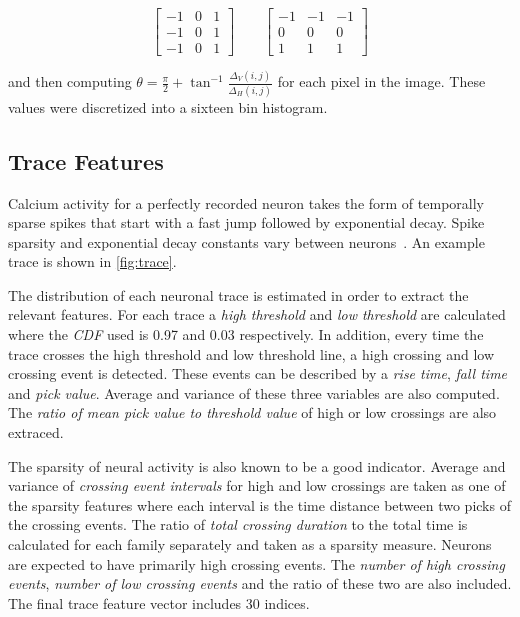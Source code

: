 \documentclass[10pt]{article}
\begin{document}
$$
\begin{bmatrix}
-1 & 0 & 1 \\ -1 & 0 & 1 \\ -1 & 0 & 1
\end{bmatrix} \qquad
\begin{bmatrix}
-1 & -1 & -1 \\
0 & 0 & 0 \\
1 & 1 & 1
\end{bmatrix}
$$

\noindent
and then computing $\theta = \frac{\pi}{2} + \tan^{-1}\frac{\Delta_V(i,j)}{\Delta_H(i,j)}$ for each pixel in the image.
These values were discretized into a sixteen bin histogram.

\subsection{Trace Features}

Calcium activity for a perfectly recorded neuron takes the form of temporally sparse spikes that start with a fast jump followed by exponential decay. Spike sparsity and exponential decay constants vary between neurons~\cite{Mukamel2009}. 
An example trace is shown in \cref{fig:trace}.

The distribution of each neuronal trace is estimated in order to extract the relevant features. For each trace a \emph{high threshold} and \emph{low threshold} are calculated where the \emph{CDF} used is \num{0.97} and \num{0.03} respectively. In addition, every time the trace crosses the high threshold and low threshold line, a high crossing and low crossing event is detected. These events can be described by a \emph{rise time}, \emph{fall time} and \emph{pick value}. Average and variance of these three variables are also computed. The \emph{ratio of mean pick value to threshold value} of high or low crossings are also extraced.

The sparsity of neural activity is also known to be a good indicator. Average and variance of \emph{crossing event intervals} for high and low crossings are taken as one of the sparsity features where each interval is the time distance between two picks of the crossing events.  The ratio of \emph{total crossing duration} to the total time is calculated for each family separately and taken as a sparsity measure. Neurons are expected to have primarily high crossing events. The \emph{number of high crossing events}, \emph{number of low crossing events} and the ratio of these two are also included. The final trace feature vector includes \num{30} indices.
\end{document}
